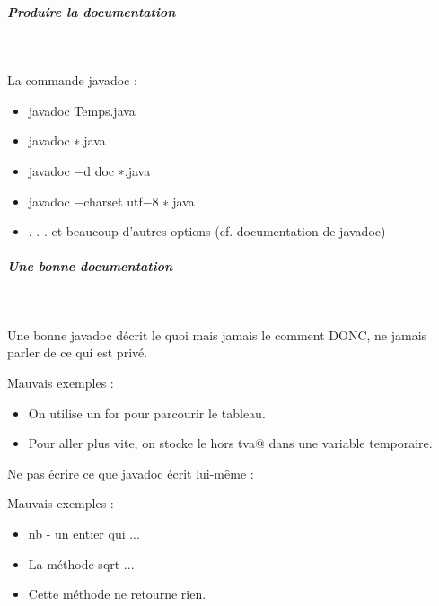 \documentclass[11pt,a4paper]{article}
\begin{document}
            \par
        
			
		\subparagraph{Produire la documentation} 
		
					\textcolor{white}{.} \par
				
        La commande javadoc : 
        
					\begin{itemize}
				
			\item javadoc Temps.java
			\item javadoc ∗.java
			\item javadoc −d doc ∗.java
			\item javadoc −charset utf−8 ∗.java
			\item . . . et beaucoup d'autres options (cf. documentation de javadoc)
					\end{itemize}
				
            \par
        
			
		\subparagraph{Une bonne documentation} 
		
					\textcolor{white}{.} \par
				
        Une bonne javadoc d\'ecrit le quoi mais jamais le comment DONC, ne jamais parler de ce qui est priv\'e.
      
            \par
        
        Mauvais exemples :
        
					\begin{itemize}
				
			\item On utilise un for pour parcourir le tableau.
			\item Pour aller plus vite, on stocke le \verb@prix hors tva@ dans une variable temporaire.
					\end{itemize}
				
            \par
        
        Ne pas \'ecrire ce que javadoc \'ecrit lui-m\^eme :
      
            \par
        
        Mauvais exemples :
        
					\begin{itemize}
				
			\item nb - un entier qui ...
			\item La m\'ethode sqrt ...
			\item Cette m\'ethode ne retourne rien.
					\end{itemize}
				
\end{document}

